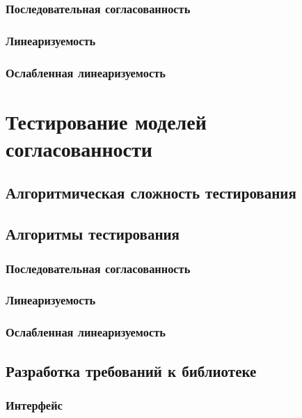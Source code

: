 \documentclass[14pt, openany]{book}
\begin{document}
\subsection{Последовательная согласованность}

\subsection{Линеаризуемость}

\subsection{Ослабленная линеаризуемость}

\chapter{Тестирование моделей согласованности}

\section{Алгоритмическая сложность тестирования}

\section{Алгоритмы тестирования}

\subsection{Последовательная согласованность}

\subsection{Линеаризуемость}

\subsection{Ослабленная линеаризуемость}

\section{Разработка требований к библиотеке}

\subsection{Интерфейс}
\end{document}
